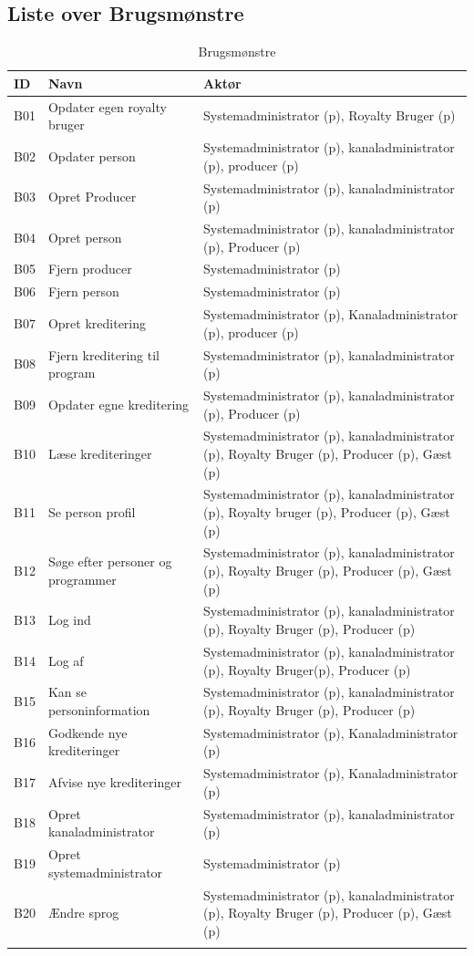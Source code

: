 \newpage
\subsection{Liste over Brugsmønstre}

\begin{longtable}[h]{|p{0.6cm}|p{6.4cm}|p{9cm}| }
\hline
\textbf{ID} & \textbf{Navn} & \textbf{Aktør} \\
\hline
B01 & Opdater egen royalty bruger & Systemadministrator (p), Royalty Bruger (p) \\
\hline
B02 & Opdater person & Systemadministrator (p), kanaladministrator (p), producer (p) \\
\hline
B03 & Opret Producer & Systemadministrator (p), kanaladministrator (p) \\
\hline
B04 & Opret person & Systemadministrator (p), kanaladministrator (p), Producer (p) \\
\hline
B05 & Fjern producer & Systemadministrator (p) \\
\hline
B06 & Fjern person & Systemadministrator (p) \\
\hline
B07 & Opret kreditering & Systemadministrator (p), Kanaladministrator (p), producer (p) \\
\hline
B08 & Fjern kreditering til program & Systemadministrator (p), kanaladministrator (p) \\
\hline
B09 & Opdater egne kreditering & Systemadministrator (p), kanaladministrator (p), Producer (p) \\
\hline
B10 & Læse krediteringer & Systemadministrator (p), kanaladministrator (p), Royalty Bruger (p), Producer (p), Gæst (p) \\
\hline
B11 & Se person profil & Systemadministrator (p), kanaladministrator (p), Royalty bruger (p), Producer (p), Gæst (p) \\
\hline
B12 & Søge efter personer og programmer & Systemadministrator (p), kanaladministrator (p), Royalty Bruger (p), Producer (p), Gæst (p) \\
\hline
B13 & Log ind & Systemadministrator (p), kanaladministrator (p), Royalty Bruger (p), Producer (p) \\
\hline
B14 & Log af & Systemadministrator (p), kanaladministrator (p), Royalty Bruger(p), Producer (p) \\
\hline
B15 & Kan se personinformation & Systemadministrator (p), kanaladministrator (p), Royalty Bruger (p), Producer (p) \\
\hline
B16 & Godkende nye krediteringer & Systemadministrator (p), Kanaladministrator (p) \\
\hline
B17 & Afvise nye krediteringer & Systemadministrator (p), Kanaladministrator (p) \\
\hline
B18 & Opret kanaladministrator & Systemadministrator (p), kanaladministrator (p) \\
\hline
B19 & Opret systemadministrator & Systemadministrator (p) \\
\hline
B20 & Ændre sprog & Systemadministrator (p), kanaladministrator (p), Royalty Bruger (p), Producer (p), Gæst (p) \\
\hline
\caption{Brugsmønstre}
\label{tab:brugsmønstre}
\end{longtable}

